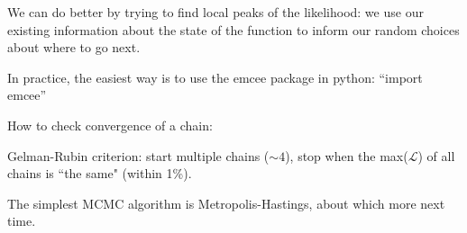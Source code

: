 \documentclass[12pt, oneside,fullpage]{article}
\newcommand{\Lc}{$\mathcal{L}$}
\begin{document}
We can do better by trying to find local peaks of the likelihood: we use our existing information about the state of the function to inform our random choices about where to go next.

\medskip

\noindent In practice, the easiest way is to use the emcee package in python: ``import emcee''

\medskip

\noindent How to check convergence of a chain:

Gelman-Rubin criterion: start multiple chains ($\sim4$), stop when the max(\Lc) of all chains is ``the same" (within 1\%).

The simplest MCMC algorithm is Metropolis-Hastings, about which more next time.
\end{document}
